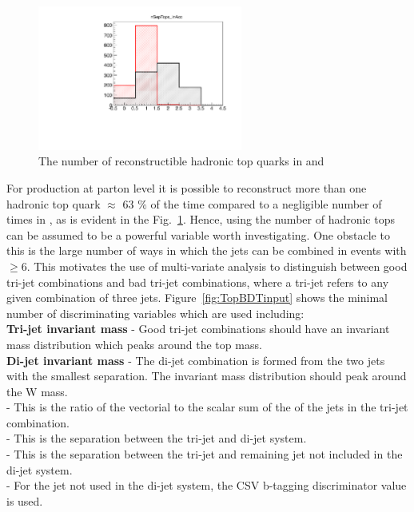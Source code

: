 \begin{figure}[!ht]
    \includegraphics[width=0.6\textwidth]{images/Run1/ReconstructibleTops.pdf}
    \caption{The number of reconstructible hadronic top quarks in \tttt and \ttbar}
    \label{fig:ReconHadTops}
\end{figure}

For \tttt production at parton level it is possible to reconstruct more than one hadronic top quark $\approx$ 63 $\%$ of the time compared to a negligible number of times in \ttbar, as is evident in the Fig.~\ref{fig:ReconHadTops}. Hence, using the number of hadronic tops can be assumed to be a powerful variable worth investigating. One obstacle to this is the large number of ways in which the jets can be combined in events with \njets $\geq 6$. This motivates the use of multi-variate analysis to distinguish between good tri-jet combinations and bad tri-jet combinations, where a tri-jet refers to any given combination of three jets. Figure~\ref{fig:TopBDTinput} shows the minimal number of discriminating variables which are used including:\\
\textbf{Tri-jet invariant mass} - Good tri-jet combinations should have an invariant mass distribution which peaks around the top mass.\\
\textbf{Di-jet invariant mass} - The di-jet combination is formed from the two jets with the smallest \DR separation. The invariant mass distribution should peak around the W mass.\\
\textbf{\ptrat} - This is the ratio of the vectorial \pt to the scalar sum of the \pt of the jets in the tri-jet combination.\\
\textbf{\DPTW} - This is the \Dphi separation between the tri-jet and di-jet system.\\
\textbf{\DPTb} - This is the \Dphi separation between the tri-jet and remaining jet not included in the di-jet system.\\
\textbf{\CSVj} - For the jet not used in the di-jet system, the CSV b-tagging discriminator value is used.\\

